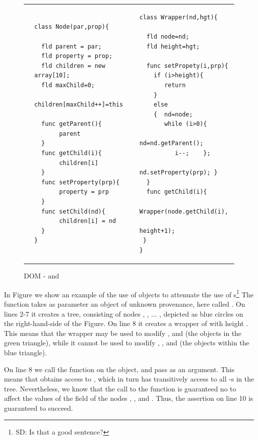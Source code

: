 \begin{figure}[htb]
\begin{tabular}{llll}
&
\begin{minipage}{0.40\textwidth}
\begin{lstlisting}
class Node(par,prop){

  fld parent = par;
  fld property = prop;
  fld children = new array[10];
  fld maxChild=0;
  children[maxChild++]=this
  
  func getParent(){
       parent 
  }  
  func getChild(i){
       children[i] 
  }
  func setProperty(prp){
       property = prp 
  }  
  func setChild(nd){
       children[i] = nd
  }  
}
\end{lstlisting}
\end{minipage}
& & 
\begin{minipage}{0.40\textwidth}
\begin{lstlisting}
class Wrapper(nd,hgt){

  fld node=nd;
  fld height=hgt;

  func setPropety(i,prp){
    if (i>height){ 
       return 
    } 
    else  
    {  nd=node;  
       while (i>0){
          nd=nd.getParent();
          i--;    };
        nd.setProperty(prp); }
  }    
  func getChild(i){ 
    Wrapper(node.getChild(i),
                    height+1); 
 }                           
}
\end{lstlisting}
\end{minipage}
\end{tabular}
 \vspace*{-7mm}
\caption{DOM -   and  }
\label{fig:DOM}
\end{figure}

In Figure we show an example of the use of   objects to attenuate the use of s\footnote{SD: Is that a good sentence?}  The function  takes as parameter an object of unknown provenance, here called . On lines 2-7 it creates a tree, consisting of nodes , , ... , depicted as blue circles on the   right-hand-side of the Figure. On line 8 it creates a wrapper of  with height . This means that the wrapper  may be used to modify ,  and  (\ie the objects in the green triangle), while it cannot be used to modify , , and  (\ie the objects within the blue triangle). 

On line 8 we call the function  on the  object, and pass  as an argument. This means that  obtains access to , which in turn has transitively access to all  -s in the tree. Nevertheless, we know that the call to the  function is guaranteed no to affect the values of the  field of the nodes , , and . Thus, the assertion on line 10 is guaranteed to succeed.

